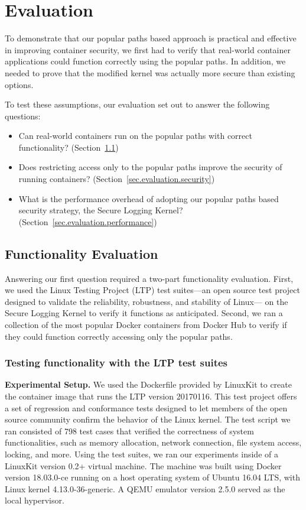 \section{Evaluation}
\label{sec.evaluation}
To demonstrate that our popular paths based approach is practical and effective in improving container security, 
we first had to verify that real-world container applications could function correctly using the popular paths. 
In addition, we needed to prove that the modified kernel was actually more secure than existing options. 

To test these assumptions, our evaluation set out to answer the following questions:
\begin{itemize}
\item Can real-world containers run on the popular paths with correct functionality? (Section~{\ref{sec.evaluation.functionality}})
\item Does restricting access only to the popular paths improve the security of running containers? (Section~{\ref{sec.evaluation.security}})
\item What is the performance overhead of adopting our popular paths based security strategy, the Secure Logging Kernel? (Section~{\ref{sec.evaluation.performance}})
\end{itemize}

\subsection{Functionality Evaluation}
\label{sec.evaluation.functionality} 
Answering our first question required a two-part functionality evaluation. 
First, we used the Linux Testing Project (LTP) \cite{LTP} test suites—an open source test project designed to validate the reliability, robustness, and stability of Linux—
on the Secure Logging Kernel to verify it functions as anticipated. 
Second, we ran a collection of the most popular Docker containers from Docker Hub to verify if they could function correctly accessing only the popular paths.

\subsubsection{Testing functionality with the LTP test suites}
\label{sec.evaluation.functionality.ltp} 
\textbf{Experimental Setup.}
We used the Dockerfile provided by LinuxKit \cite{LinuxKit} to create the container image that runs the LTP version 20170116. 
This test project offers a set of regression and conformance tests designed to let members of the open source community confirm the behavior of the Linux kernel. 
The test script we ran consisted of 798 test cases that verified the correctness of system functionalities, 
such as memory allocation, network connection, file system access, locking, and more. 
Using the test suites, we ran our experiments inside of a LinuxKit version 0.2+ virtual machine. 
The machine was built using Docker version 18.03.0-ce running on a host operating system of Ubuntu 16.04 LTS, with Linux kernel 4.13.0-36-generic. 
A QEMU emulator version 2.5.0 served as the local hypervisor. 

